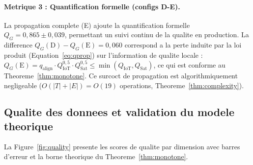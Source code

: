 \documentclass[12pt,a4paper]{article}
\theoremstyle{plain}
\theoremstyle{definition}
\theoremstyle{remark}
\begin{document}
	\paragraph{Metrique 3 : Quantification formelle (configs D-E).}
	La propagation complete (E) ajoute la quantification formelle
	$Q_G = 0{,}865 \pm 0{,}039$, permettant un suivi continu de la
	qualite en production. La difference $Q_G(\text{D}) - Q_G(\text{E}) =
	0{,}060$ correspond a la perte induite par la loi produit
	(Equation~\ref{eq:qprop}) sur l'information de qualite locale :
	$Q_G(\text{E}) = q_{\text{align}} \cdot Q_{\text{IoT}}^{0{,}5}
	\cdot Q_{\text{Sat}}^{0{,}5} \leq \min(Q_{\text{IoT}}, Q_{\text{Sat}})$,
	ce qui est conforme au Theoreme~\ref{thm:monotone}.
	Ce surcoct de propagation est algorithmiquement negligeable
	($O(|T|+|E|) = O(19)$ operations, Theoreme~\ref{thm:complexity}).
	
	\subsection{Qualite des donnees et validation du modele theorique}
	
	La Figure~\ref{fig:quality} presente les scores de qualite par dimension
	avec barres d'erreur et la borne theorique du Theoreme~\ref{thm:monotone}.
	
\end{document}
